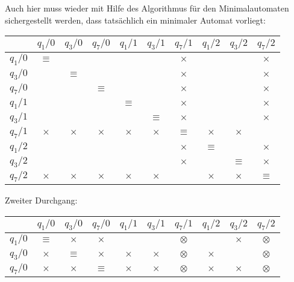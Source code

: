 \begin{loesung}
\begin{teilaufgaben}
\begin{center}
\end{center}
Auch hier muss wieder mit Hilfe des Algorithmus für den Minimalautomaten
sichergestellt werden, dass tatsächlich ein minimaler Automat vorliegt:
\begin{center}
\begin{tabular}{|c|ccccccccc|}
\hline
         &$q_1/0$  &$q_3/0$  &$q_7/0$  &$q_1/1$  &$q_3/1$  &$q_7/1$  &$q_1/2$  &$q_3/2$  &$q_7/2$  \\
\hline
$q_1/0$  &$\equiv$ &         &         &         &         &$\times$ &         &         &$\times$ \\
$q_3/0$  &         &$\equiv$ &         &         &         &$\times$ &         &         &$\times$ \\
$q_7/0$  &         &         &$\equiv$ &         &         &$\times$ &         &         &$\times$ \\
$q_1/1$  &         &         &         &$\equiv$ &         &$\times$ &         &         &$\times$ \\
$q_3/1$  &         &         &         &         &$\equiv$ &$\times$ &         &         &$\times$ \\
$q_7/1$  &$\times$ &$\times$ &$\times$ &$\times$ &$\times$ &$\equiv$ &$\times$ &$\times$ &         \\
$q_1/2$  &         &         &         &         &         &$\times$ &$\equiv$ &         &$\times$ \\
$q_3/2$  &         &         &         &         &         &$\times$ &         &$\equiv$ &$\times$ \\
$q_7/2$  &$\times$ &$\times$ &$\times$ &$\times$ &$\times$ &         &$\times$ &$\times$ &$\equiv$ \\
\hline
\end{tabular}
\end{center}
Zweiter Durchgang:
\begin{center}
\begin{tabular}{|c|ccccccccc|}
\hline
         &$q_1/0$  &$q_3/0$  &$q_7/0$  &$q_1/1$  &$q_3/1$  &$q_7/1$  &$q_1/2$  &$q_3/2$  &$q_7/2$  \\
\hline
$q_1/0$  &$\equiv$ &$\times$ &$\times$ &         &         &$\otimes$&         &$\times$ &$\otimes$\\
$q_3/0$  &$\times$ &$\equiv$ &$\times$ &$\times$ &$\times$ &$\otimes$&$\times$ &         &$\otimes$\\
$q_7/0$  &$\times$ &$\times$ &$\equiv$ &$\times$ &$\times$ &$\otimes$&$\times$ &$\times$ &$\otimes$\\

\end{tabular}
\end{center}
\end{teilaufgaben}
\end{loesung}
